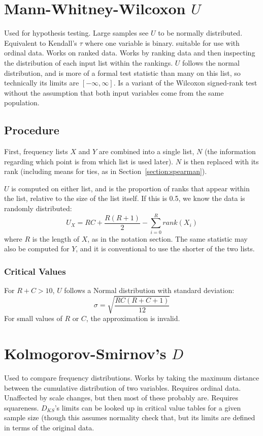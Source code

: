 \documentclass[11pt]{article}
\begin{document}
\section{Mann-Whitney-Wilcoxon $U$}
Used for hypothesis testing.  Large samples see $U$ to be normally distributed.  Equivalent to Kendall's $\tau$ where one variable is binary.  suitable for use with ordinal data.  Works on ranked data.  Works by ranking data and then inspecting the distribution of each input list within the rankings.  $U$ follows the normal distribution, and is more of a formal test statistic than many on this list, so technically its limits are $[-\infty, \infty]$.  Is a variant of the Wilcoxon signed-rank test without the assumption that both input variables come from the same population.

\subsection{Procedure}
First, frequency lists $X$ and $Y$ are combined into a single list, $N$ (the information regarding which point is from which list is used later).  $N$ is then replaced with its rank (including means for ties, as in Section~\ref{section:spearman}).

$U$ is computed on either list, and is the proportion of ranks that appear within the list, relative to the size of the list itself.  If this is 0.5, we know the data is randomly distributed:
$$
U_X = RC + \frac{ R(R+1) }{ 2 } - \sum_{i=0}^{R}{ rank(X_i) }
$$
where $R$ is the length of $X$, as in the notation section.  The same statistic may also be computed for $Y$, and it is conventional to use the shorter of the two lists.

\subsubsection{Critical Values}
For $R+C > 10$, $U$ follows a Normal distribution with standard deviation:
$$
\sigma = \sqrt{  \frac{  RC(R + C + 1)  }{  12 } }
$$
For small values of $R$ or $C$, the approximation is invalid.














\section{Kolmogorov-Smirnov's $D$}
Used to compare frequency distributions.  Works by taking the maximum distance between the cumulative distribution of two variables.  Requires ordinal data.  Unaffected by scale changes, but then most of these probably are.  Requires squareness.  $D_{KS}$'s limits can be looked up in critical value tables for a given sample size (though this assumes normality {\color{red} check that}, but its limits are defined in terms of the original data.
\end{document}
